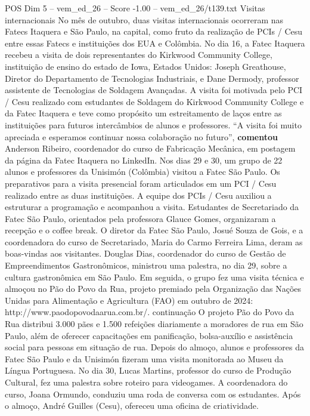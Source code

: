 \begin{textsample}{POS Dim 5 – vem\_ed\_26 – Score -1.00 – vem\_ed\_26/t139.txt}  \label{ex:f5_pos_077}
Visitas internacionais No mês de outubro, duas visitas internacionais ocorreram nas Fatecs Itaquera e São Paulo, na capital, como fruto da realização de PCIs / Cesu entre essas Fatecs e instituições dos EUA e Colômbia.
No dia 16, a Fatec Itaquera recebeu a visita de dois representantes do Kirkwood Community College, instituição de ensino do estado de Iowa, Estados Unidos: Joseph Greathouse, Diretor do Departamento de Tecnologias Industriais, e Dane Dermody, professor assistente de Tecnologias de Soldagem Avançadas.
A visita foi motivada pelo PCI / Cesu realizado com estudantes de Soldagem do Kirkwood Community College e da Fatec Itaquera e teve como propósito um estreitamento de laços entre as instituições para futuros intercâmbios de alunos e professores. “A visita foi muito apreciada e esperamos continuar nossa colaboração no futuro”, \textbf{comentou} Anderson Ribeiro, coordenador do curso de Fabricação Mecânica, em postagem da página da Fatec Itaquera no LinkedIn.
Nos dias 29 e 30, um grupo de 22 alunos e professores da Unisimón (Colômbia) visitou a Fatec São Paulo.
Os preparativos para a visita presencial foram articulados em um PCI / Cesu realizado entre as duas instituições.
A equipe dos PCIs / Cesu auxiliou a estruturar a programação e acompanhou a visita.
Estudantes de Secretariado da Fatec São Paulo, orientados pela professora Glauce Gomes, organizaram a recepção e o coffee break.
O diretor da Fatec São Paulo, Josué Souza de Gois, e a coordenadora do curso de Secretariado, Maria do Carmo Ferreira Lima, deram as boas-vindas aos visitantes.
Douglas Dias, coordenador do curso de Gestão de Empreendimentos Gastronômicos, ministrou uma palestra, no dia 29, sobre a cultura gastronômica em São Paulo.
Em seguida, o grupo fez uma visita técnica e almoçou no Pão do Povo da Rua, projeto premiado pela Organização das Nações Unidas para Alimentação e Agricultura (FAO) em outubro de 2024: http://www.paodopovodaarua.com.br/. continuação O projeto Pão do Povo da Rua distribui 3.000 pães e 1.500 refeições diariamente a moradores de rua em São Paulo, além de oferecer capacitações em panificação, bolsa-auxílio e assistência social para pessoas em situação de rua.
Depois do almoço, alunos e professores da Fatec São Paulo e da Unisimón fizeram uma visita monitorada ao Museu da Língua Portuguesa.
No dia 30, Lucas Martins, professor do curso de Produção Cultural, fez uma palestra sobre roteiro para videogames.
A coordenadora do curso, Joana Ormundo, conduziu uma roda de conversa com os estudantes.
Após o almoço, André Guilles (Cesu), ofereceu uma oficina de criatividade.

\end{textsample}
